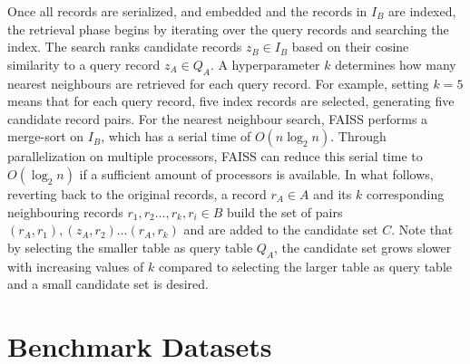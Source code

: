 \documentclass[sigconf,nonacm]{acmart}
\begin{document}
Once all records are serialized, and embedded and the records in $I_B$ are indexed,  the retrieval phase begins by iterating over the query records and searching the index. The search ranks candidate records $z_B\in I_B$ based on their cosine similarity to a query record $z_A \in Q_A$. A hyperparameter $k$ determines how many nearest neighbours are retrieved for each query record. For example, setting $k=5$ means that for each query record, five index records are selected, generating five candidate record pairs. For the nearest neighbour search, FAISS performs a merge-sort on $I_B$, which has a serial time of $O(n \log_2 n)$. Through parallelization on multiple processors, FAISS can reduce this serial time to $O(\log_2 n)$ if a sufficient amount of processors is available. In what follows, reverting back to the original records, a record $r_A\in A$ and its $k$ corresponding neighbouring records $r_1, r_2 \dots, r_k, r_i\in B$ build the set of pairs $(r_A, r_1), (z_A, r_2) \dots (r_A, r_k)$ and are added to the candidate set $C$. Note that by selecting the smaller table as query table $Q_A$, the candidate set grows slower with increasing values of $k$ compared to selecting the larger table as query table and a small candidate set is desired.


%
 \section{Benchmark Datasets}
\label{sec:datasets}
\end{document}
